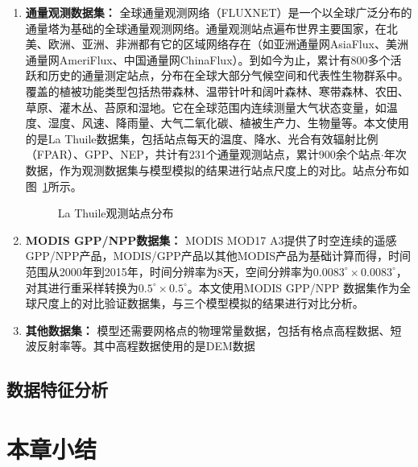 \begin{enumerate}[(1)]
    \item \textbf{通量观测数据集：}
    全球通量观测网络（FLUXNET）是一个以全球广泛分布的通量塔为基础的全球通量观测网络。通量观测站点遍布世界主要国家，在北美、欧洲、亚洲、非洲都有它的区域网络存在（如亚洲通量网AsiaFlux、美洲通量网AmeriFlux、中国通量网ChinaFlux）。到如今为止，累计有800多个活跃和历史的通量测定站点，分布在全球大部分气候空间和代表性生物群系中。覆盖的植被功能类型包括热带森林、温带针叶和阔叶森林、寒带森林、农田、草原、灌木丛、苔原和湿地。它在全球范围内连续测量大气状态变量，如温度、湿度、风速、降雨量、大气二氧化碳、植被生产力、生物量等。本文使用的是La Thuile数据集，包括站点每天的温度、降水、光合有效辐射比例（FPAR）、GPP、NEP，共计有231个通量观测站点，累计900余个站点$\cdot$年次数据，作为观测数据集与模型模拟的结果进行站点尺度上的对比。站点分布如图~\ref{fig:Thuile-site-POI}所示。

    \begin{figure}
        \centering
        \caption{La Thuile观测站点分布}
        \label{fig:Thuile-site-POI}
    \end{figure}

    \item \textbf{MODIS GPP/NPP数据集：}
    MODIS MOD17 A3提供了时空连续的遥感GPP/NPP产品，MODIS/GPP产品以其他MODIS产品为基础计算而得，时间范围从2000年到2015年，时间分辨率为8天，空间分辨率为$0.0083^{\circ} \times 0.0083^{\circ}$，对其进行重采样转换为$0.5^{\circ} \times 0.5^{\circ}$。本文使用MODIS GPP/NPP 数据集作为全球尺度上的对比验证数据集，与三个模型模拟的结果进行对比分析。

    \item \textbf{其他数据集：}
    模型还需要网格点的物理常量数据，包括有格点高程数据、短波反射率等。其中高程数据使用的是DEM数据
\end{enumerate}

\subsection{数据特征分析}





\section{本章小结}
